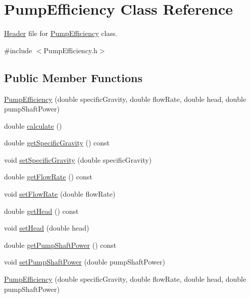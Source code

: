 \hypertarget{class_pump_efficiency}{}\section{Pump\+Efficiency Class Reference}
\label{class_pump_efficiency}


\hyperlink{class_header}{Header} file for \hyperlink{class_pump_efficiency}{Pump\+Efficiency} class.  




{\ttfamily \#include $<$Pump\+Efficiency.\+h$>$}

\subsection*{Public Member Functions}
\begin{DoxyCompactItemize}
\item 
\hyperlink{class_pump_efficiency_abe1f431db681c3a512a7f9f11ff182cb}{Pump\+Efficiency} (double specific\+Gravity, double flow\+Rate, double head, double pump\+Shaft\+Power)
\item 
double \hyperlink{class_pump_efficiency_ab45de46019ff182d4f11810b2791a8c9}{calculate} ()
\item 
double \hyperlink{class_pump_efficiency_a6eeeabb70d99a79a636f35ca74d8ec05}{get\+Specific\+Gravity} () const
\item 
void \hyperlink{class_pump_efficiency_afc8b3ecd0fe1a356c82042aa0fc84024}{set\+Specific\+Gravity} (double specific\+Gravity)
\item 
double \hyperlink{class_pump_efficiency_a715c4ade497e99640f09546fad6479bc}{get\+Flow\+Rate} () const
\item 
void \hyperlink{class_pump_efficiency_aad051c44f6bdbc6108f2c40450c9d510}{set\+Flow\+Rate} (double flow\+Rate)
\item 
double \hyperlink{class_pump_efficiency_aa89f7727e67b3e0d20149eee66d10f69}{get\+Head} () const
\item 
void \hyperlink{class_pump_efficiency_addfa92d7c30598ecedcee8f7c47eed29}{set\+Head} (double head)
\item 
double \hyperlink{class_pump_efficiency_aeb6d4f2cce565fbe834d71c7a52b87d1}{get\+Pump\+Shaft\+Power} () const
\item 
void \hyperlink{class_pump_efficiency_ad3c2e64a590528b54e3878f9d1f3223a}{set\+Pump\+Shaft\+Power} (double pump\+Shaft\+Power)
\item 
\hyperlink{class_pump_efficiency_abe1f431db681c3a512a7f9f11ff182cb}{Pump\+Efficiency} (double specific\+Gravity, double flow\+Rate, double head, double pump\+Shaft\+Power)

\end{DoxyCompactItemize}
